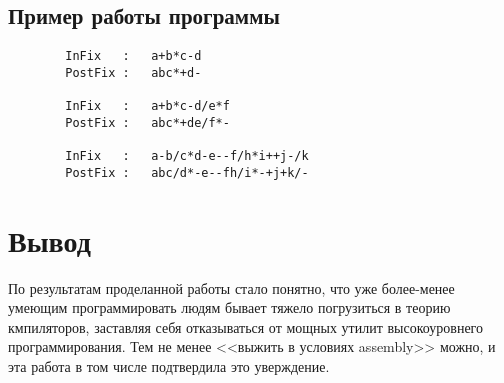 \documentclass[12pt]{extarticle}
\begin{document}
\begin{sloppypar}
 	\normalsize
 	
 	\newpage
 	
 	\subsection{Пример работы программы}
 	
 	\begin{verbatim}
 		InFix   :	a+b*c-d
 		PostFix :	abc*+d-
 		
 		InFix   :	a+b*c-d/e*f
 		PostFix :	abc*+de/f*-
 		
 		InFix   :	a-b/c*d-e--f/h*i++j-/k
 		PostFix :	abc/d*-e--fh/i*-+j+k/-
 	\end{verbatim}
 	
 	\section{Вывод}
 	
 	По результатам проделанной работы стало понятно, что уже более-менее умеющим программировать людям бывает тяжело погрузиться в теорию кмпиляторов, заставляя себя отказываться от мощных утилит высокоуровнего программирования. Тем не менее <<выжить в условиях assembly>> можно, и эта работа в том числе подтвердила это уверждение.
		
	\end{sloppypar}
\end{document}
